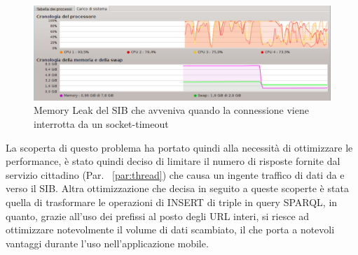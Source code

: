 \begin{figure}[H]
	\centering
	\includegraphics[width=1.0\textwidth]{assets/sib-memory-leak.png}
	\caption{Memory Leak del SIB che avveniva quando la connessione viene interrotta da un socket-timeout}
	\label{fig:sib-memory-leak}
\end{figure}

\noindent
La scoperta di questo problema ha portato quindi alla necessità di ottimizzare le performance, è stato quindi deciso di limitare il numero di risposte fornite dal servizio cittadino (Par. ~\ref{par:thread}) che causa un ingente traffico di dati da e verso il SIB. Altra ottimizzazione che decisa in seguito a queste scoperte è stata quella di trasformare le operazioni di INSERT di triple in query SPARQL, in quanto, grazie all'uso dei prefissi al posto degli URL interi, si riesce ad ottimizzare notevolmente il volume di dati scambiato, il che porta a notevoli vantaggi durante l'uso nell'applicazione mobile.









